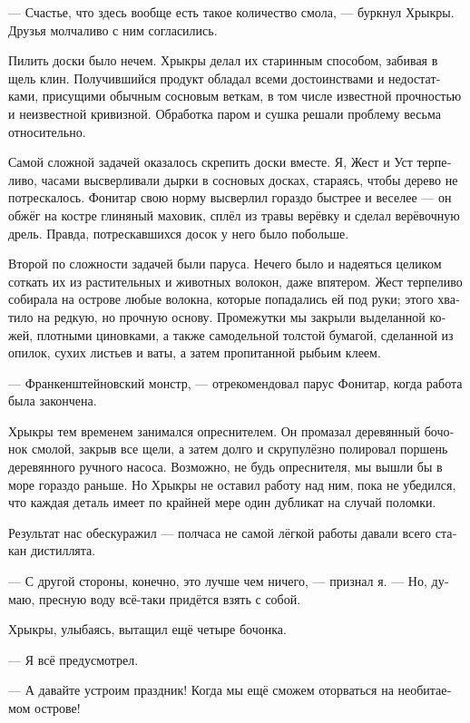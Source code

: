 \documentclass[a4paper,10pt,fleqn]{book}\usepackage{polyglossia}\setdefaultlanguage[babelshorthands=true]{russian}\setotherlanguage{english}\defaultfontfeatures{Ligatures=TeX,Mapping=tex-text}
\newcommand{\asterism}{\vspace{1em}{\centering\Large\bfseries$\ast~\ast~\ast$\par}\vspace{1em}}
\begin{document}
--- Счастье, что здесь вообще есть такое количество смола, --- буркнул Хрыкры.
Друзья молчаливо с ним согласились.

Пилить доски было нечем.
Хрыкры делал их старинным способом, забивая в щель клин.
Получившийся продукт обладал всеми достоинствами и недостатками, присущими обычным сосновым веткам, в том числе известной прочностью и неизвестной кривизной.
Обработка паром и сушка решали проблему весьма относительно.

Самой сложной задачей оказалось скрепить доски вместе.
Я, Жест и Уст терпеливо, часами высверливали дырки в сосновых досках, стараясь, чтобы дерево не потрескалось.
Фонитар свою норму высверлил гораздо быстрее и веселее --- он обжёг на костре глиняный маховик, сплёл из травы верёвку и сделал верёвочную дрель.
Правда, потрескавшихся досок у него было побольше.

Второй по сложности задачей были паруса.
Нечего было и надеяться целиком соткать их из растительных и животных волокон, даже впятером.
Жест терпеливо собирала на острове любые волокна, которые попадались ей под руки;
этого хватило на редкую, но прочную основу.
Промежутки мы закрыли выделанной кожей, плотными циновками, а также самодельной толстой бумагой, сделанной из опилок, сухих листьев и ваты, а затем пропитанной рыбьим клеем.

--- Франкенштейновский монстр, --- отрекомендовал парус Фонитар, когда работа была закончена.

\asterism

Хрыкры тем временем занимался опреснителем.
Он промазал деревянный бочонок смолой, закрыв все щели, а затем долго и скрупулёзно полировал поршень деревянного ручного насоса.
Возможно, не будь опреснителя, мы вышли бы в море гораздо раньше.
Но Хрыкры не оставил работу над ним, пока не убедился, что каждая деталь имеет по крайней мере один дубликат на случай поломки.

Результат нас обескуражил --- полчаса не самой лёгкой работы давали всего стакан дистиллята.

--- С другой стороны, конечно, это лучше чем ничего, --- признал я.
--- Но, думаю, пресную воду всё-таки придётся взять с собой.

Хрыкры, улыбаясь, вытащил ещё четыре бочонка.

--- Я всё предусмотрел.

\asterism

--- А давайте устроим праздник!
Когда мы ещё сможем оторваться на необитаемом острове!
\end{document}
